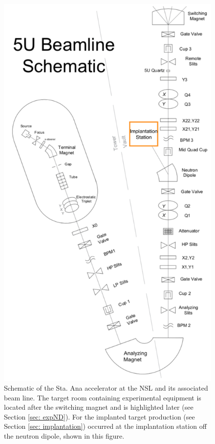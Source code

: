 \begin{figure}
\centering
\includegraphics[width=0.7\linewidth]{figures/staAnaSchematic.png}
\caption{Schematic of the Sta. Ana accelerator at the NSL and its associated beam line. The target room containing experimental equipment is located after the switching magnet and is highlighted later (see Section \ref{sec: expND}). For the implanted target production (see Section \ref{sec: implantation}) occurred at the implantation station off the neutron dipole, shown in this figure.}
\label{fig: staAnaSchematic}
\end{figure}

